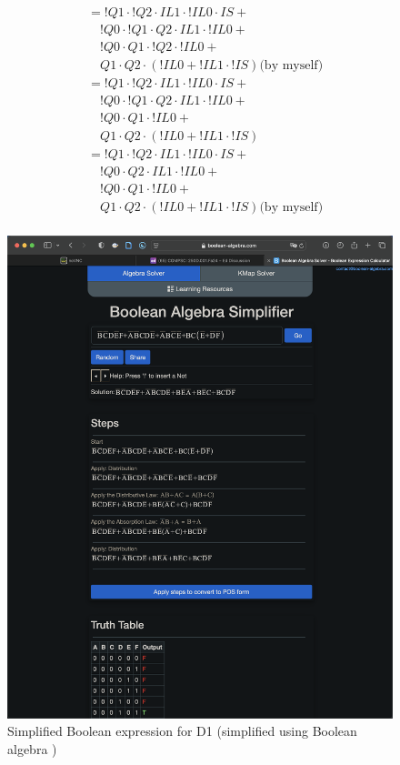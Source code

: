 \begin{multicols}{2}
    \begin{align*}
        &=     !Q1 \cdot !Q2 \cdot  IL1 \cdot !IL0 \cdot  IS + \\
        &\quad !Q0 \cdot !Q1 \cdot  Q2 \cdot  IL1 \cdot !IL0 + \\
        &\quad !Q0 \cdot  Q1 \cdot !Q2 \cdot !IL0 + \\
        &\quad  Q1 \cdot  Q2 \cdot (!IL0 + !IL1 \cdot !IS)  \text{(by myself)}\\
    &=     !Q1 \cdot !Q2 \cdot  IL1 \cdot !IL0 \cdot  IS + \\
    &\quad !Q0 \cdot !Q1 \cdot  Q2 \cdot  IL1 \cdot !IL0 + \\
    &\quad !Q0 \cdot  Q1 \cdot !IL0 + \\
    &\quad  Q1 \cdot  Q2 \cdot (!IL0 + !IL1 \cdot !IS) \\
        &=     !Q1 \cdot !Q2 \cdot  IL1 \cdot !IL0 \cdot  IS + \\
        &\quad !Q0 \cdot  Q2 \cdot  IL1 \cdot !IL0 + \\
        &\quad !Q0 \cdot  Q1 \cdot !IL0 + \\
        &\quad  Q1 \cdot  Q2 \cdot (!IL0 + !IL1 \cdot !IS) \text{(by myself)}\\
    \end{align*}
    \columnbreak
    \begin{figure}[H]
        \centering
        \includegraphics[width=0.66\linewidth]{figures/D1simp.png}
        \caption{Simplified Boolean expression for D1 (simplified using Boolean algebra \cite{boolean-algebra})}
    \end{figure}
\end{multicols}

